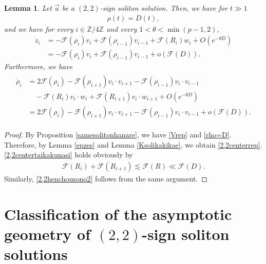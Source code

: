 \documentclass[reqno]{amsart}
\theoremstyle{plain}
\newtheorem{lemma}[theorem]{Lemma}
\theoremstyle{definition}
\numberwithin{equation}{section}
\begin{document}
\begin{lemma}\label{2,2centerdynamics2}
Let $\vec{u}$ be a $(2,2)$-sign soliton solution. Then, we have for $t\gg 1$
\begin{align}\label{rho=D}
\rho(t)=D(t),
\end{align}
and we have for every $i\in\mathbb{Z}/4\mathbb{Z}$ and every $1<\theta<\min{(p-1,2)}$,
\begin{align}
\dot{z}_i&=-\mathcal{F}(\rho_i)v_i+\mathcal{F}(\rho_{i-1})v_{i-1}+\mathcal{F}(R_i)w_i+O\left(e^{-\theta D}\right) \label{2,2centerrep}
\\
&=-\mathcal{F}(\rho_i)v_i+\mathcal{F}(\rho_{i-1})v_{i-1}+o\left(\mathcal{F}(D)\right). \label{2,2centertaikakunasi}
\end{align}
Furthermore, we have
\begin{align}\label{2,2henchousono2}
\begin{aligned}
\dot{\rho}_i&=2\mathcal{F}(\rho_i)-\mathcal{F}(\rho_{i+1})v_i\cdot v_{i+1}-\mathcal{F}(\rho_{i-1})v_i\cdot v_{i-1}
\\
&\quad-\mathcal{F}(R_i)v_i\cdot w_i+\mathcal{F}(R_{i+1})v_i\cdot w_{i+1}+O\left(e^{-\theta D}\right)
\\
&=2\mathcal{F}(\rho_i)-\mathcal{F}(\rho_{i+1})v_i\cdot v_{i+1}-\mathcal{F}(\rho_{i-1})v_i\cdot v_{i-1}+o\left(\mathcal{F}(D)\right).
\end{aligned}
\end{align}
\end{lemma}
\begin{proof}
By Proposition \ref{samesolitonhanare}, we have \eqref{Vrep} and \eqref{rho=D}. Therefore, by Lemma \ref{epzes} and Lemma \ref{Ksolikakikae}, we obtain \eqref{2,2centerrep}. \eqref{2,2centertaikakunasi} holds obviously by 
\begin{align*}
\mathcal{F}(R_i)+\mathcal{F}(R_{i+1})\lesssim \mathcal{F}(R)\ll \mathcal{F}(D).
\end{align*}
Similarly, \eqref{2,2henchousono2} follows from the same argument.
\end{proof}


\section{Classification of the asymptotic geometry of $(2,2)$-sign soliton solutions}
\end{document}
